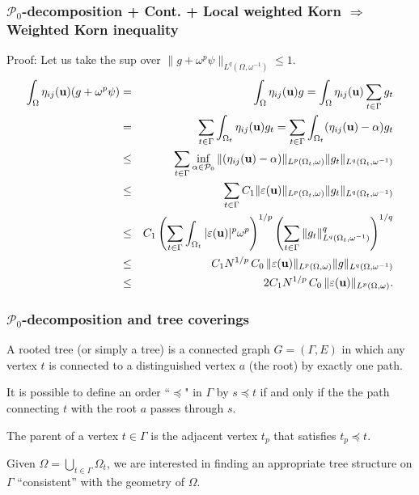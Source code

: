 \documentclass[small,xcolor=svgnames]{beamer}
\def\o{\omega}
\def\O{\Omega}
\def\uu{{\bf u}}
\def\P{\mathcal{P}}
\def\c{\color{blue}}
\begin{document}
\begin{frame}\frametitle{$\P_0$-decomposition + Cont. + Local weighted Korn $\Rightarrow$ \\ Weighted Korn inequality}

{\c Proof:} Let us take the sup over $\|g+\o^p\psi\|_{L^q(\O,\o^{-1})}\leq 1$.
\begin{eqnarray*}
\int_{\Omega} \eta_{ij}(\uu)(g+\o^p\psi)&=&\int_{\Omega} \eta_{ij}(\uu)g=\int_{\Omega} \eta_{ij}(\uu)\sum_{t\in\Gamma} g_t\\
&=&\sum_{t\in\Gamma} \int_{\Omega_t} \eta_{ij}(\uu)g_t=\sum_{t\in\Gamma} \int_{\Omega_t} (\eta_{ij}(\uu)-\alpha)g_t\\
&\leq&\sum_{t\in\Gamma} \inf_{\alpha\in\P_0} \|(\eta_{ij}(\uu)-\alpha)\|_{L^p(\O_t,\o)}\|g_t\|_{L^q(\O_t,\o^{-1})}\\
&\leq&\sum_{t\in\Gamma} C_1\|\varepsilon(\uu)\|_{L^p(\O_t,\o)}\|g_t\|_{L^{q}(\O_t,\o^{-1})}\\ 
&\leq&C_1 \left(\sum_{t\in\Gamma} \int_{\O_t} |\varepsilon(\uu)|^p\o^p\right)^{1/p}\left(\sum_{t\in\Gamma} \|g_t\|_{L^{q}(\O_t,\o^{-1})}^q\right)^{1/{q}}\\
&\leq&C_1N^{1/p}\,C_0\,\|\varepsilon(\uu)\|_{L^p(\O,\o)} \|g\|_{L^q(\O,\o^{-1})}\\ 
&\leq&2C_1 N^{1/p}\,C_0\,\|\varepsilon(\uu)\|_{L^p(\O,\o)}.
\end{eqnarray*}

\end{frame}






\begin{frame}\frametitle{$\P_0$-decomposition and tree coverings}

A {\c rooted tree} (or simply a tree) is a connected graph $G=(\Gamma,E)$ in which any vertex $t$ is connected to a distinguished vertex $a$ ({\c the root}) by exactly one path.

\bigskip

It is possible to define an order ``{\c $\preceq$}" in $\Gamma$ by $s\preceq t$ if and only if the the path connecting $t$ with the root $a$ passes through $s$.

\bigskip

{\c The parent} of a vertex $t\in \Gamma$ is the adjacent vertex {\c $t_p$} that satisfies $t_p\preceq t$.

\bigskip

Given $\Omega=\bigcup_{t\in\Gamma} \Omega_t$, we are interested in finding an appropriate tree structure on $\Gamma$ ``consistent'' with the geometry of $\O$.

\end{frame}
\end{document}
